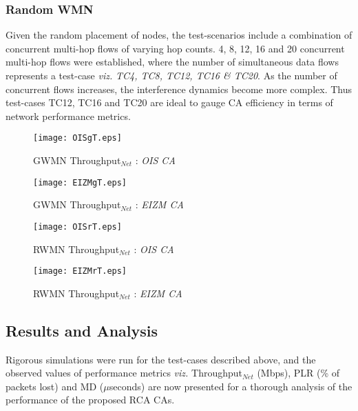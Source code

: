 \documentclass[conference]{IEEEtran}
\begin{document}
\subsubsection {Random WMN}
Given the random placement of nodes, the test-scenarios include a combination of concurrent multi-hop flows of varying hop counts. 4, 8, 12, 16 and 20 concurrent multi-hop flows were established, where the number of simultaneous data flows represents a test-case \emph{viz.} \textit{TC4, TC8, TC12, TC16 \& TC20}. As the number of concurrent flows increases, the interference dynamics become more complex. Thus test-cases TC12, TC16 and TC20 are ideal to gauge CA efficiency in terms of network performance metrics.
\begin{figure}[htb!]
\texttt{[image: OISgT.eps]}
                \caption{GWMN Throughput$_{Net}$  : \textit{OIS CA}}
                \label{OISGT}
                	 \vspace{.1cm}
        \end{figure}
\begin{figure}[htb!]
\texttt{[image: EIZMgT.eps]}
\caption{GWMN Throughput$_{Net}$  : \textit{EIZM CA}}
\label{EIZMGT}
	  \vspace{.1cm}
\end{figure}
\begin{figure}[htb!]
\texttt{[image: OISrT.eps]}
                \caption{RWMN Throughput$_{Net}$  : \textit{OIS CA}}
                \label{OISRT}
                	 \vspace{.1cm}
        \end{figure}
\begin{figure}[htb!]
\texttt{[image: EIZMrT.eps]}
	\caption{RWMN Throughput$_{Net}$  : \textit{EIZM CA}}
	\label{EIZMRT}
		 \vspace{.1cm}
\end{figure}

\subsection{Results and Analysis}
Rigorous simulations were run for the test-cases described above, and the observed values of performance metrics \emph{viz.} Throughput$_{Net}$ (Mbps), PLR (\% of packets lost) and MD ($\mu$seconds) are now presented for a thorough analysis of the performance of the proposed RCA CAs. 
\end{document}
